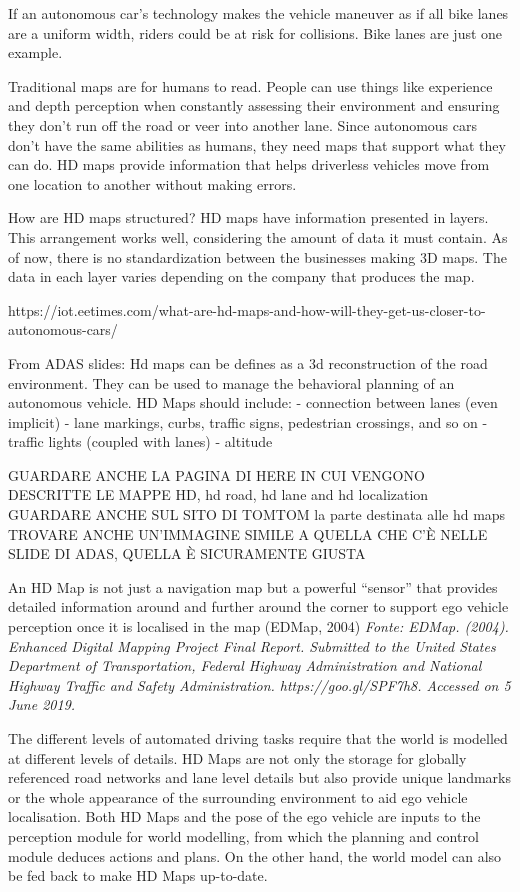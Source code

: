 If an autonomous car’s technology makes the vehicle maneuver as if all bike lanes are a uniform width, riders could be at risk for collisions. Bike lanes are just one example.

Traditional maps are for humans to read. People can use things like experience and depth perception when constantly assessing their environment and ensuring they don’t run off the road or veer into another lane. Since autonomous cars don’t have the same abilities as humans, they need maps that support what they can do. HD maps provide information that helps driverless vehicles move from one location to another without making errors.

How are HD maps structured?
HD maps have information presented in layers. This arrangement works well, considering the amount of data it must contain. As of now, there is no standardization between the businesses making 3D maps. The data in each layer varies depending on the company that produces the map.

https://iot.eetimes.com/what-are-hd-maps-and-how-will-they-get-us-closer-to-autonomous-cars/



From ADAS slides:
Hd maps can be defines as a 3d reconstruction of the road environment. They can be used to manage the behavioral planning of an autonomous vehicle. 
HD Maps should include:
- connection between lanes (even implicit)
- lane markings, curbs, traffic signs, pedestrian crossings, and so on 
- traffic lights (coupled with lanes)  
- altitude 

GUARDARE ANCHE LA PAGINA DI HERE IN CUI VENGONO DESCRITTE LE MAPPE HD, hd road, hd lane and hd localization 
GUARDARE ANCHE SUL SITO DI TOMTOM la parte destinata alle hd maps 
TROVARE ANCHE UN'IMMAGINE SIMILE A QUELLA CHE C'È NELLE SLIDE DI ADAS, QUELLA È SICURAMENTE GIUSTA 



An HD Map is not just a navigation map
but a powerful “sensor” that provides detailed information around and further around the
corner to support ego vehicle perception once it is localised in the map (EDMap, 2004)
\textit{Fonte: EDMap. (2004). Enhanced Digital Mapping Project Final Report. Submitted to the United States Department
of Transportation, Federal Highway Administration and National Highway Traffic and Safety Administration.
https://goo.gl/SPF7h8. Accessed on 5 June 2019.}


The different levels of automated driving tasks require that the world is modelled at
different levels of details. HD Maps are not only the storage for globally referenced road
networks and lane level details but also provide unique landmarks or the whole appearance
of the surrounding environment to aid ego vehicle localisation. Both HD Maps and the
pose of the ego vehicle are inputs to the perception module for world modelling, from
which the planning and control module deduces actions and plans. On the other hand, the
world model can also be fed back to make HD Maps up-to-date.

